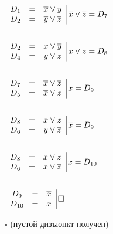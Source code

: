 \documentclass[russian]{lecture-notes}
\begin{document}
    \begin{example}
        $
        \left.
        \begin{array}{ccc}
            D_{1} & = & \overline{x} \lor y            \\
            D_{2} & = & \overline{y} \lor \overline{z} \\
        \end{array}
        \right. \vline \overline{x} \lor \overline{z} = D_{7}
        $

        $ $

        $
        \left.
        \begin{array}{ccc}
            D_{2} & = & x \lor \overline{y} \\
            D_{4} & = & y \lor z            \\
        \end{array}
        \right. \vline x \lor z = D_{8}
        $

        $ $

        $
        \left.
        \begin{array}{ccc}
            D_{7} & = & \overline{x} \lor \overline{z} \\
            D_{5} & = & \overline{x} \lor z            \\
        \end{array}
        \right. \vline x = D_{9}
        $

        $ $

        $
        \left.
        \begin{array}{ccc}
            D_{8} & = & x \lor z            \\
            D_{6} & = & y \lor \overline{z} \\
        \end{array}
        \right. \vline \overline{x} = D_{9}
        $

        $ $

        $
        \left.
        \begin{array}{ccc}
            D_{8} & = & x \lor z            \\
            D_{6} & = & x \lor \overline{z} \\
        \end{array}
        \right. \vline x = D_{10}
        $

        $ $

        $
        \left.
        \begin{array}{ccc}
            D_{9}  & = & \overline{x} \\
            D_{10} & = & x            \\
        \end{array}
        \right. \vline \square
        $

        $\square $ (пустой дизъюнкт получен)

    \end{example}
\end{document}
